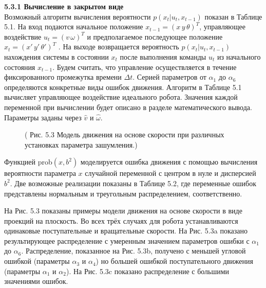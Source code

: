 \documentclass[10pt,a4paper]{article}
\begin{document}
\textbf{5.3.1 Вычисление в закрытом виде}\\

Возможный алгоритм вычисления вероятности $p(x_t | u_t, x_{t-1})$ показан в Таблице 5.1. На вход подаются начальное положение  $x_{t-1} = (x\, y\, \theta)^T$, управляющее воздействие $u_t = (v\, \omega)^T$ и предполагаемое последующее положение $x_t = (x'\, y'\, \theta')^T$ . На выходе возвращается вероятность $p(x_t | u_t, x_{t-1})$ нахождения системы в состоянии $x_t$ после выполнения команды $u_t$ из начального состояния $x_{t-1}$. Будем считать, что управление осуществляется в течение фиксированного промежутка времени $\varDelta t$. Серией параметров от $\alpha_1$ до $\alpha_6$ определяются конкретные виды ошибок движения. Алгоритм в Таблице 5.1 вычисляет управляющее воздействие идеального робота. Значения каждой переменной при вычислении будет описано в разделе математического вывода. Параметры заданы через $\hat{v}$
и $\hat{\omega}$.

\begin{figure}[H]
	\caption{ (  Рис. 5.3 Модель движения на основе скорости при различных установках параметра зашумления.)}
	\label{fig:53orig}
\end{figure}

Функцией prob$(x, b^2)$ моделируется ошибка движения с помощью вычисления вероятности параметра $x$ случайной переменной с центром в нуле и дисперсией $b^2$. Две возможные реализации показаны в Таблице 5.2, где переменные ошибок представлены нормальным и треугольным распределением, соответственно. 

На Рис. 5.3 показаны примеры модели движения на основе скорости в виде проекций на плоскость. Во всех трёх случаях для робота устанавливаются одинаковые поступательные и вращательные скорости. На Рис. 5.3a показано результирующее распределение с умеренным значением параметров ошибки с $\alpha_1$ до $\alpha_6$. Распределение, показанное на Рис. 5.3b, получено с меньшей угловой ошибкой (параметры $\alpha_3$ и $\alpha_4$) но большей ошибкой поступательного движения (параметры $\alpha_1$ и $\alpha_2$). На Рис. 5.3c показано распределение с большими значениями ошибок.\\
\end{document}
